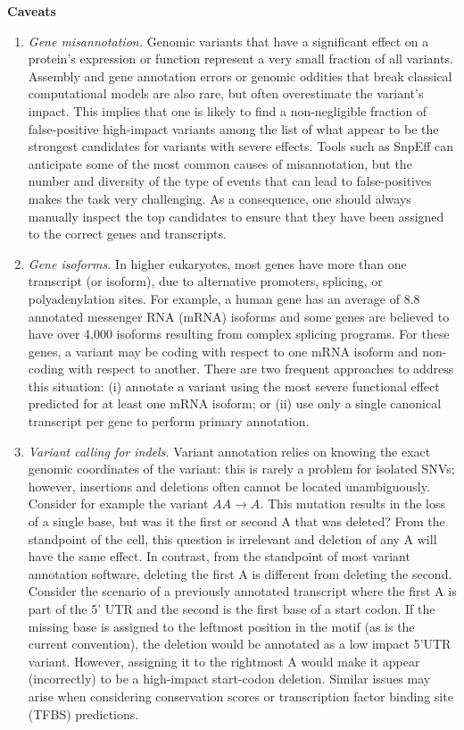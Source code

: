 \textbf{Caveats}
	\begin{enumerate}[label=\roman*]
	
	\item \textit{Gene misannotation.} Genomic variants that have a significant effect on a protein’s expression or function represent a very small fraction of all variants. Assembly and gene annotation errors or genomic oddities that break classical computational models are also rare, but often overestimate the variant’s impact. This implies that one is likely to find a non-negligible fraction of false-positive high-impact variants among the list of what appear to be the strongest candidates for variants with severe effects. Tools such as SnpEff can anticipate some of the most common causes of misannotation, but the number and diversity of the type of events that can lead to false-positives makes the task very challenging. As a consequence, one should always manually inspect the top candidates to ensure that they have been assigned to the correct genes and transcripts.
	
	\item \textit{Gene isoforms.} In higher eukaryotes, most genes have more than one transcript (or isoform), due to alternative promoters, splicing, or polyadenylation sites. For example, a human gene has an average of 8.8 annotated messenger RNA (mRNA) isoforms and some genes are believed to have over 4,000 isoforms resulting from complex splicing programs. For these genes, a variant may be coding with respect to one mRNA isoform and non-coding with respect to another. There are two frequent approaches to address this situation: (i) annotate a variant using the most severe functional effect predicted for at least one mRNA isoform; or (ii) use only a single canonical transcript per gene to perform primary annotation. 
	
	\item \textit{Variant calling for indels.} Variant annotation relies on knowing the exact genomic coordinates of the variant: this is rarely a problem for isolated SNVs; however, insertions and deletions often cannot be located unambiguously. Consider for example the variant $AA \rightarrow A$. This mutation results in the loss of a single base, but was it the first or second A that was deleted? From the standpoint of the cell, this question is irrelevant and deletion of any A will have the same effect. In contrast, from the standpoint of most variant annotation software, deleting the first A is different from deleting the second. Consider the scenario of a previously annotated transcript where the first A is part of the 5' UTR and the second is the first base of a start codon. If the missing base is assigned to the leftmost position in the motif (as is the current convention), the deletion would be annotated as a low impact 5'UTR variant. However, assigning it to the rightmost A would make it appear (incorrectly) to be a high-impact start-codon deletion. Similar issues may arise when considering conservation scores or transcription factor binding site (TFBS) predictions.
	
		\end{enumerate}


